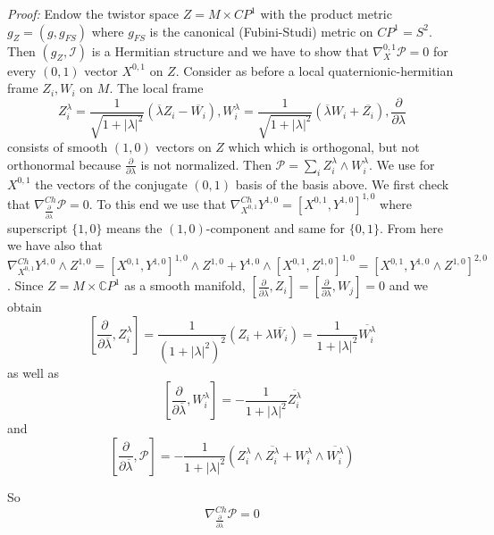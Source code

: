 \documentclass[11pt,oneside,leqno]{amsart}
\theoremstyle{plain}
\theoremstyle{definition}
\begin{document}
{\it Proof:} Endow the twistor space $Z=M\times CP^1$ with the product metric $g_Z=(g, g_{FS})$ where $g_{FS}$ is the canonical (Fubini-Studi) metric on $CP^1=S^2$. Then $(g_Z, \mathcal{I})$ is a Hermitian structure and we have to show that $\nabla_X^{0,1} \mathcal{P}=0$ for every $(0,1)$ vector $X^{0,1}$ on $Z$. Consider as before a local quaternionic-hermitian frame $Z_i, W_i$ on $M$. The local frame $$ Z_i^{\lambda} = \frac{1}{\sqrt{1+|\lambda|^2}}(\overline{\lambda}Z_i  - \overline{W_i}), W_i^{\lambda} = \frac{1}{\sqrt{1+|\lambda|^2}}(\overline{\lambda}W_i  + \overline{Z_i}), \frac{\partial}{\partial\lambda}$$ consists of smooth $(1,0)$ vectors on $Z$ which which is orthogonal, but not orthonormal because $\frac{\partial}{\partial\lambda}$ is not normalized. Then $\mathcal{P} = \sum_i Z_i^{\lambda}\wedge W_i^{\lambda}$. We use for $X^{0,1}$ the vectors of the conjugate $(0,1)$ basis of the basis above. We first check that $\nabla^{Ch}_{\frac{\partial}{\partial\overline{\lambda}}}\mathcal{P}=0$. To this end we use that $\nabla^{Ch}_{X^{0,1}}Y^{1,0} = [X^{0,1},Y^{1,0}]^{1,0}$ where superscript $\{1,0\}$ means the $(1,0)$-component and same for $\{0,1\}$. From here we have also that $\nabla^{Ch}_{X^{0,1}}Y^{1,0}\wedge Z^{1,0} = [X^{0,1},Y^{1,0}]^{1,0}\wedge Z^{1,0} + Y^{1,0}\wedge[X^{0,1},Z^{1,0}]^{1,0} = [X^{0,1}, Y^{1,0}\wedge Z^{1,0}]^{2,0}$. Since $Z=M\times\mathbb{C}P^1$ as a smooth manifold, $[\frac{\partial}{\partial\overline{\lambda}}, Z_i]= [\frac{\partial}{\partial\overline{\lambda}},W_j]=0$ and we obtain
\begin{equation}
\left[\frac{\partial}{\partial\overline{\lambda}}, Z_i^{\lambda}\right] = \frac{1}{(1+|\lambda|^2)^2}\left(Z_i+\lambda\overline{W_i}\right) = \frac{1}{1+|\lambda|^2}\overline{W_i^{\lambda}}
\end{equation}
as well as
\begin{equation}
\left[\frac{\partial}{\partial\overline{\lambda}}, W_i^{\lambda}\right] = -\frac{1}{1+|\lambda|^2}\overline{Z_i^{\lambda}}
\end{equation}
and
\begin{equation}
\left[\frac{\partial}{\partial\overline{\lambda}}, \mathcal{P}\right] = -\frac{1}{1+|\lambda|^2} (Z_i^{\lambda}\wedge\overline{Z_i^{\lambda}}+W_i^{\lambda}\wedge\overline{W_i^{\lambda}})
\end{equation}

So
\begin{equation}
\nabla^{Ch}_{\frac{\partial}{\partial\overline{\lambda}}}\mathcal{P} = 0
\end{equation}
\end{document}
